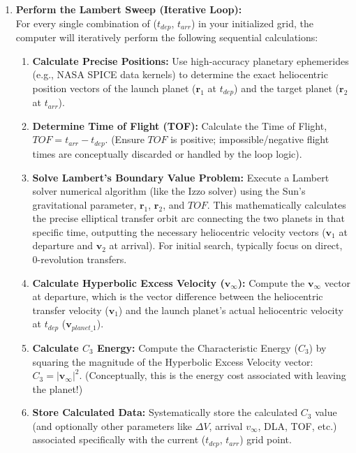 \documentclass[12pt]{article}
\begin{document}
\begin{enumerate}
    \item \textbf{Perform the Lambert Sweep (Iterative Loop):} \\
    For every single combination of ($t_{dep}$, $t_{arr}$) in your initialized grid, the computer will iteratively perform the following sequential calculations:
    \begin{enumerate}
        \item \textbf{Calculate Precise Positions:} Use high-accuracy planetary ephemerides (e.g., NASA SPICE data kernels) to determine the exact heliocentric position vectors of the launch planet ($\mathbf{r}_1$ at $t_{dep}$) and the target planet ($\mathbf{r}_2$ at $t_{arr}$).
        \item \textbf{Determine Time of Flight (TOF):} Calculate the Time of Flight, $TOF = t_{arr} - t_{dep}$. (Ensure $TOF$ is positive; impossible/negative flight times are conceptually discarded or handled by the loop logic).
        \item \textbf{Solve Lambert's Boundary Value Problem:} Execute a Lambert solver numerical algorithm (like the Izzo solver) using the Sun's gravitational parameter, $\mathbf{r}_1$, $\mathbf{r}_2$, and $TOF$. This mathematically calculates the precise elliptical transfer orbit arc connecting the two planets in that specific time, outputting the necessary heliocentric velocity vectors ($\mathbf{v}_1$ at departure and $\mathbf{v}_2$ at arrival). For initial search, typically focus on direct, 0-revolution transfers.
        \item \textbf{Calculate Hyperbolic Excess Velocity ($\mathbf{v}_{\infty}$):} Compute the $\mathbf{v}_{\infty}$ vector at departure, which is the vector difference between the heliocentric transfer velocity ($\mathbf{v}_1$) and the launch planet's actual heliocentric velocity at $t_{dep}$ ($\mathbf{v}_{planet\_1}$).
        \item \textbf{Calculate $C_3$ Energy:} Compute the Characteristic Energy ($C_3$) by squaring the magnitude of the Hyperbolic Excess Velocity vector: $C_3 = | \mathbf{v}_{\infty} |^2$. (Conceptually, this is the energy cost associated with leaving the planet!)
        \item \textbf{Store Calculated Data:} Systematically store the calculated $C_3$ value (and optionally other parameters like $\Delta V$, arrival $v_{\infty}$, DLA, TOF, etc.) associated specifically with the current ($t_{dep}$, $t_{arr}$) grid point.
    \end{enumerate}


\end{enumerate}
\end{document}
